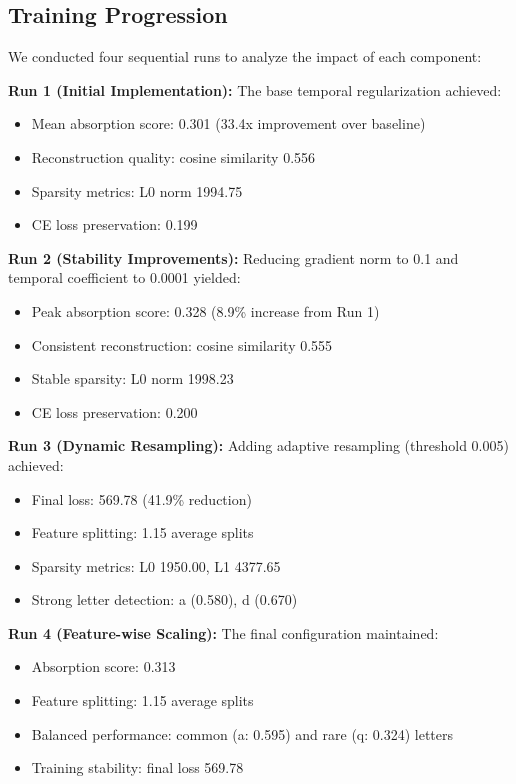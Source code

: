 \documentclass{article} %
\begin{document}
\subsection{Training Progression}
We conducted four sequential runs to analyze the impact of each component:

\textbf{Run 1 (Initial Implementation):} The base temporal regularization achieved:
\begin{itemize}
    \item Mean absorption score: 0.301 (33.4x improvement over baseline)
    \item Reconstruction quality: cosine similarity 0.556
    \item Sparsity metrics: L0 norm 1994.75
    \item CE loss preservation: 0.199
\end{itemize}

\textbf{Run 2 (Stability Improvements):} Reducing gradient norm to 0.1 and temporal coefficient to 0.0001 yielded:
\begin{itemize}
    \item Peak absorption score: 0.328 (8.9\% increase from Run 1)
    \item Consistent reconstruction: cosine similarity 0.555
    \item Stable sparsity: L0 norm 1998.23
    \item CE loss preservation: 0.200
\end{itemize}

\textbf{Run 3 (Dynamic Resampling):} Adding adaptive resampling (threshold 0.005) achieved:
\begin{itemize}
    \item Final loss: 569.78 (41.9\% reduction)
    \item Feature splitting: 1.15 average splits
    \item Sparsity metrics: L0 1950.00, L1 4377.65
    \item Strong letter detection: a (0.580), d (0.670)
\end{itemize}

\textbf{Run 4 (Feature-wise Scaling):} The final configuration maintained:
\begin{itemize}
    \item Absorption score: 0.313
    \item Feature splitting: 1.15 average splits
    \item Balanced performance: common (a: 0.595) and rare (q: 0.324) letters
    \item Training stability: final loss 569.78
\end{itemize}
\end{document}
